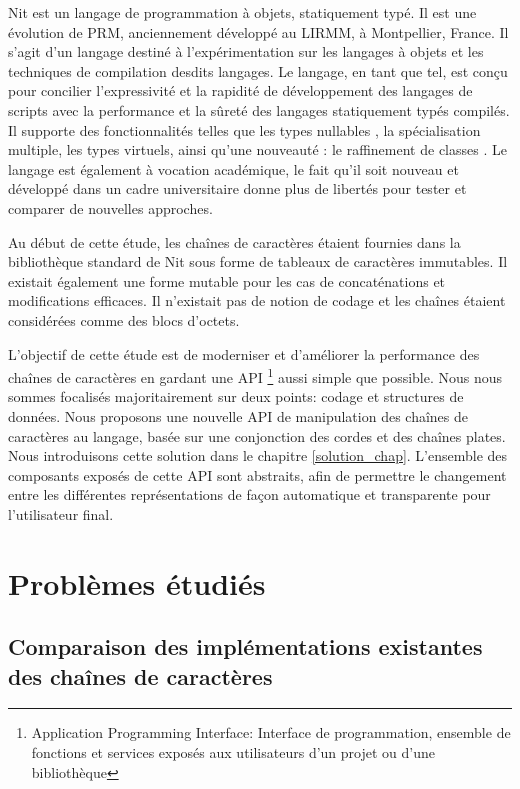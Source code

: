 \begin{introduction}
Nit est un langage de programmation à objets, statiquement typé.
Il est une évolution de PRM, anciennement
développé au LIRMM, à Montpellier, France. Il s'agit d'un langage
destiné à l'expérimentation sur les langages à objets et les techniques
de compilation desdits langages.
Le langage, en tant que tel, est conçu pour concilier
l'expressivité et la rapidité de développement des langages de scripts avec
la performance et la sûreté des langages statiquement typés compilés.
Il supporte des fonctionnalités telles que les types nullables \cite{gelinas2009prevention},
la spécialisation multiple, les types virtuels, ainsi qu'une nouveauté
: le raffinement de classes \cite{privat2005raffinement}.
Le langage est également à vocation académique, le fait qu'il soit
nouveau et développé dans un cadre universitaire donne plus de
libertés pour tester et comparer de nouvelles approches.

Au début de cette étude, les chaînes de caractères étaient fournies dans
la bibliothèque standard de Nit sous forme de tableaux de caractères immutables.
Il existait également une forme mutable pour les cas de concaténations et
modifications efficaces.
Il n'existait pas de notion de codage et les chaînes étaient considérées comme
des blocs d'octets.

L'objectif de cette étude est de moderniser et d'améliorer la performance des chaînes
de caractères en gardant une API
\footnote{Application Programming Interface: Interface de programmation, ensemble de fonctions et services exposés aux utilisateurs d'un projet ou d'une bibliothèque}
aussi simple que possible.
Nous nous sommes focalisés majoritairement sur deux points: codage et structures de données.
Nous proposons une nouvelle API de manipulation des chaînes de
caractères au langage, basée sur une conjonction des
cordes et des chaînes plates.
Nous introduisons cette solution dans le chapitre \ref{solution_chap}.
L'ensemble des composants exposés de cette
API sont abstraits, afin de permettre le changement entre
les différentes représentations de façon automatique et transparente pour
l'utilisateur final.

\section{Problèmes étudiés}\label{probluxe8mes-uxe9tudiuxe9s}

\subsection{Comparaison des implémentations existantes des chaînes de
caractères}\label{intro_structs}


\end{introduction}
